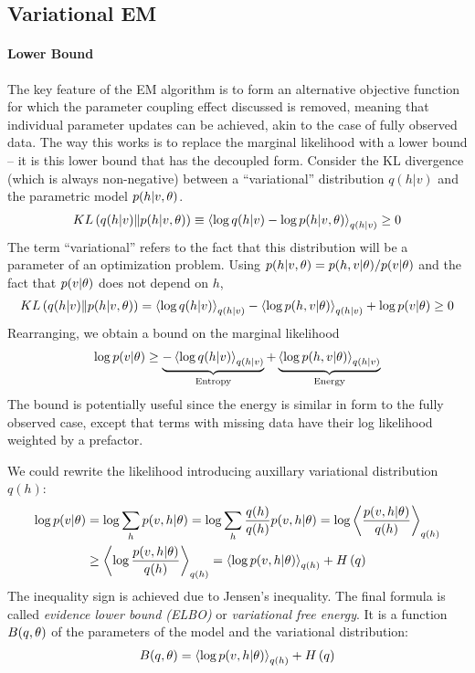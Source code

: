 \subsection{Variational EM}

\paragraph{Lower Bound}

The key feature of the EM algorithm is to form an alternative objective function for which the parameter coupling effect discussed is removed, meaning that individual parameter updates can be achieved, akin to the case of fully observed data. The way this works is to replace the marginal likelihood with a lower bound -- it is this lower bound that has the decoupled form. Consider the KL divergence (which is always non-negative) between a ``variational'' distribution $q(h|v)$ and the parametric model $p(h|v,\theta)$.
\begin{align*}
	KL\left(q(h|v)\|p(h|v,\theta)\right)\equiv\left\langle\log q(h|v)-\log p(h|v,\theta)\right\rangle_{q(h|v)}\geq 0
\end{align*}
The term ``variational'' refers to the fact that this distribution will be a parameter of an optimization problem. Using $p(h|v,\theta)=p(h,v|\theta)/p(v|\theta)$ and the fact that $p(v|\theta)$ does not depend on $h$,
\begin{align*}
	KL\left(q(h|v)\|p(h|v,\theta)\right)=\left\langle\log q(h|v)\right\rangle_{q(h|v)}-\left\langle\log p(h,v|\theta)\right\rangle_{q(h|v)}+\log p(v|\theta)\geq 0
\end{align*}
Rearranging, we obtain a bound on the marginal likelihood
\begin{align*}
	\log p(v|\theta)\geq\underbrace{-\left\langle\log q(h|v)\right\rangle_{q(h|v)}}_\text{$\text{Entropy}$}+\underbrace{\left\langle\log p(h,v|\theta)\right\rangle_{q(h|v)}}_\text{$\text{Energy}$}
\end{align*}
The bound is potentially useful since the energy is similar in form to the fully observed case, except that terms with missing data have their log likelihood weighted by a prefactor.

We could rewrite the likelihood introducing auxillary variational distribution $q(h)$:
\begin{align*}
	\log p(v|\theta)&=\log\sum_hp(v,h|\theta)=\log\sum_h\frac{q(h)}{q(h)}p(v,h|\theta)=\log\left\langle\frac{p(v,h|\theta)}{q(h)}\right\rangle_{q(h)} \\
	&\geq\left\langle\log\frac{p(v,h|\theta)}{q(h)}\right\rangle_{q(h)}=\left\langle\log p(v,h|\theta)\right\rangle_{q(h)}+H\left(q\right)
\end{align*}
The inequality sign is achieved due to Jensen's inequality. The final formula is called \emph{evidence lower bound (ELBO)} or \emph{variational free energy}. It is a function $B(q,\theta)$ of the parameters of the model and the variational distribution:
\begin{align*}
	B(q,\theta)=\left\langle\log p(v,h|\theta)\right\rangle_{q(h)}+H\left(q\right)
\end{align*}

